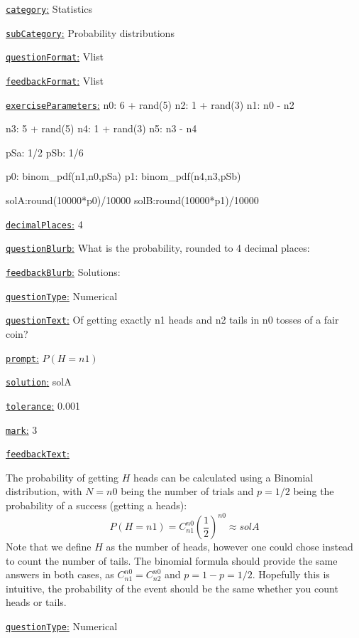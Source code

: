 \documentclass[preview]{standalone}
\newcommand \fieldname[1]{\underline{\texttt{#1}:}}
\begin{document}
\fieldname{category}  %
Statistics

\fieldname{subCategory} %
Probability distributions

\fieldname{questionFormat}
Vlist

\fieldname{feedbackFormat}
Vlist

\fieldname{exerciseParameters}
n0: 6 + rand(5)
n2: 1 + rand(3)
n1: n0 - n2

n3: 5 + rand(5)
n4: 1 + rand(3)
n5: n3 - n4

pSa: 1/2
pSb: 1/6

p0: binom_pdf(n1,n0,pSa)
p1: binom_pdf(n4,n3,pSb)

solA:round(10000*p0)/10000
solB:round(10000*p1)/10000

\fieldname{decimalPlaces}
4

\fieldname{questionBlurb}
What is the probability, rounded to 4 decimal places:

\fieldname{feedbackBlurb}
Solutions:

\fieldname{questionType}
Numerical

\fieldname{questionText}
Of getting exactly {n1} heads and {n2} tails in {n0} tosses of a fair coin?

\fieldname{prompt}
$P(H = {n1})$

\fieldname{solution}
solA

\fieldname{tolerance}
0.001

\fieldname{mark}
3

\fieldname{feedbackText}

The probability of getting $H$ heads can be calculated using a Binomial distribution, with $N={n0}$ being the number of trials and $p=1/2$ being the probability of a success (getting a heads):
\[
P(H = {n1})  = C^{{n0}}_{{n1}}  \left(\frac{1}{2}\right)^{{n0}} \approx {solA}
\]
Note that we define $H$ as the number of heads, however one could chose instead to count the number of tails. The binomial formula should provide the same answers in both cases, as $C^{{n0}}_{{n1}} = C^{{n0}}_{{n2}}$ and $p=1-p=1/2$. Hopefully this is intuitive, the probability of the event should be the same whether you count heads or tails.

\fieldname{questionType}
Numerical
\end{document}
